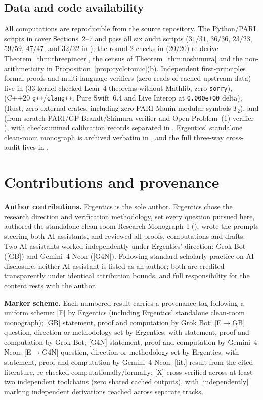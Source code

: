 \documentclass[11pt]{amsart}
\numberwithin{equation}{section}
\theoremstyle{plain}
\theoremstyle{definition}\newtheorem{definition}[theorem]{Definition}
\theoremstyle{remark}\newtheorem{remark}[theorem]{Remark}
\newcommand{\ctag}[1]{\textup{\textsf{\scriptsize[#1]}}}
\begin{document}
\subsection*{Data and code availability}
All computations are reproducible from the source repository. The Python/PARI scripts in  cover Sections~2--7 and pass all six audit scripts ($31/31$, $36/36$, $23/23$, $59/59$, $47/47$, and $32/32$ in ); the round-2 checks in  ($20/20$) re-derive Theorem~\ref{thm:threepincer}, the census of Theorem~\ref{thm:noshimura} and the non-arithmeticity in Proposition~\ref{prop:cyclotomic}(b). Independent first-principles formal proofs and multi-language verifiers (zero reads of cached upstream data) live in  (33 kernel-checked Lean~4 theorems without Mathlib, zero \texttt{sorry}),  (C++20 \texttt{g++}/\texttt{clang++}, Pure Swift~6.4 and Live Interop at \texttt{0.000e+00} delta),  (Rust, zero external crates, including zero-PARI Manin modular symbols $T_2$), and  (from-scratch PARI/GP Brandt/Shimura verifier  and Open Problem~(1) verifier ), with checksummed calibration records separated in . Ergentics' standalone clean-room monograph is archived verbatim in , and the full three-way cross-audit lives in .

\section*{Contributions and provenance}\label{sec:contrib}
\textbf{Author contributions.} Ergentics is the sole author. Ergentics chose the research direction and verification methodology, set every question pursued here, authored the standalone clean-room Research Monograph~I (), wrote the prompts steering both AI assistants, and reviewed all proofs, computations and drafts. Two AI assistants worked independently under Ergentics' direction: Grok Bot (\ctag{GB}) and Gemini~4 Neon (\ctag{G4N}). Following standard scholarly practice on AI disclosure, neither AI assistant is listed as an author; both are credited transparently under identical attribution bounds, and full responsibility for the content rests with the author.

\textbf{Marker scheme.} Each numbered result carries a provenance tag following a uniform scheme: \ctag{E} by Ergentics (including Ergentics' standalone clean-room monograph); \ctag{GB} statement, proof and computation by Grok Bot; \ctag{E$\to$GB} question, direction or methodology set by Ergentics, with statement, proof and computation by Grok Bot; \ctag{G4N} statement, proof and computation by Gemini~4 Neon; \ctag{E$\to$G4N} question, direction or methodology set by Ergentics, with statement, proof and computation by Gemini~4 Neon; \ctag{lit.} result from the cited literature, re-checked computationally/formally; \ctag{X} cross-verified across at least two independent toolchains (zero shared cached outputs), with \ctag{independently} marking independent derivations reached across separate tracks.
\end{document}
